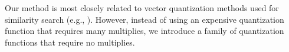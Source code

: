 






Our method is most closely related to vector quantization methods used for similarity search (e.g., \cite{bolt,quickAdc,quickerAdc,pq,opq}). However, instead of using an expensive quantization function that requires many multiplies, we introduce a family of quantization functions that require no multiplies. %

